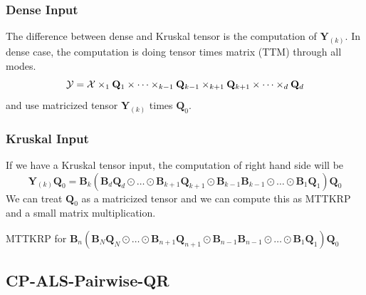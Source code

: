 \documentclass{article}
\newcommand{\mat}[1]{\mathbf{#1}}
\newcommand{\T}[2][]{#1{\mathbf{\cal{#2}}}} 						%
\begin{document}
\subsubsection{Dense Input}
The difference between dense and Kruskal tensor is the computation of $\mat{Y}_{(k)}$. In dense case, the computation is doing tensor times matrix (TTM) through all modes.
$$\T[]{Y} = \T[]{X} \times_1 \mat{Q}_1 \times \dots \times_{k-1} \mat{Q}_{k-1} \times_{k+1}\mat{Q}_{k+1} \times \dots \times_d \mat{Q}_d$$
and use matricized tensor $\mat{Y}_{(k)}$ times $\mat{Q}_0$.

\subsubsection{Kruskal Input}
If we have a Kruskal tensor input, the computation of right hand side will be 
\begin{equation}
  \mat{Y}_{(k)}\mat{Q}_0  = \mat{B}_k(\mat{B}_d\mat{Q}_d \odot \dots \odot \mat{B}_{k+1}\mat{Q}_{k+1} \odot \mat{B}_{k-1}\mat{B}_{k-1} \odot  \dots \odot \mat{B}_1\mat{Q}_1)\mat{Q}_0 \nonumber 
\end{equation}
We can treat $\mat{Q}_0$ as a matricized tensor and we can compute this as MTTKRP and a small matrix multiplication.

\begin{algorithm}[!ht]
  \begin{algorithmic}
    \State MTTKRP for $\mat{B}_n(\mat{B}_N\mat{Q}_N \odot \dots \odot \mat{B}_{n+1}\mat{Q}_{n+1} \odot \mat{B}_{n-1}\mat{B}_{n-1} \odot  \dots \odot \mat{B}_1\mat{Q}_1)\mat{Q}_0 $
  \end{algorithmic}
\end{algorithm}



\subsection{CP-ALS-Pairwise-QR}
\end{document}

